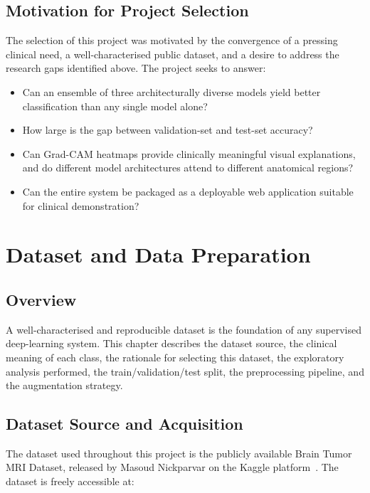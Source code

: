\documentclass[12pt,a4paper,oneside]{report}
\begin{document}
\section{Motivation for Project Selection}

The selection of this project was motivated by the convergence of a pressing clinical need, a well-characterised public dataset, and a desire to address the research gaps identified above. The project seeks to answer:

\begin{itemize}[leftmargin=*]
  \item Can an ensemble of three architecturally diverse models yield better classification than any single model alone?
  \item How large is the gap between validation-set and test-set accuracy?
  \item Can Grad-CAM heatmaps provide clinically meaningful visual explanations, and do different model architectures attend to different anatomical regions?
  \item Can the entire system be packaged as a deployable web application suitable for clinical demonstration?
\end{itemize}

\chapter{Dataset and Data Preparation}

\section{Overview}

A well-characterised and reproducible dataset is the foundation of any supervised deep-learning system. This chapter describes the dataset source, the clinical meaning of each class, the rationale for selecting this dataset, the exploratory analysis performed, the train/validation/test split, the preprocessing pipeline, and the augmentation strategy.

\section{Dataset Source and Acquisition}

The dataset used throughout this project is the publicly available Brain Tumor MRI Dataset, released by Masoud Nickparvar on the Kaggle platform~\cite{nickparvar2022}. The dataset is freely accessible at:
\end{document}
